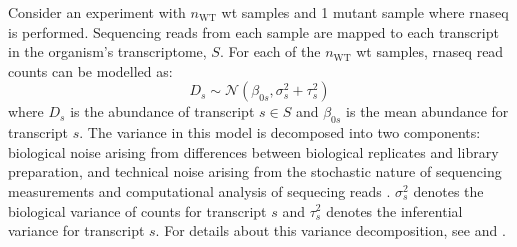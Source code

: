 Consider an experiment with $n_\mathrm{WT}$ \gls{wt} samples and 1 mutant sample where \gls{rnaseq} is performed.
Sequencing reads from each sample are mapped to each transcript in the organism's transcriptome, $S$.
For each of the $n_\mathrm{WT}$ \gls{wt} samples, \gls{rnaseq} read counts can be modelled as:
%
\begin{equation}
  D_s \sim \mathcal{N} \left( \beta_{0s}, \sigma_s^2 + \tau_s^2 \right)
  \label{eqn:wt_model}
\end{equation}
%
where $D_s$ is the abundance of transcript $s \in S$ and $\beta_{0s}$ is the mean abundance for transcript $s$.
The variance in this model is decomposed into two components: biological noise arising from differences between biological replicates and library preparation, and technical noise arising from the stochastic nature of sequencing measurements and computational analysis of sequecing reads \cite{pimentelDifferentialAnalysisRNAseq2017}.
$\sigma_s^2$ denotes the biological variance of counts for transcript $s$ and $\tau_s^2$ denotes the inferential variance for transcript $s$.
For details about this variance decomposition, see \cite[REF][]{pimentelDifferentialAnalysisRNAseq2017} and .

